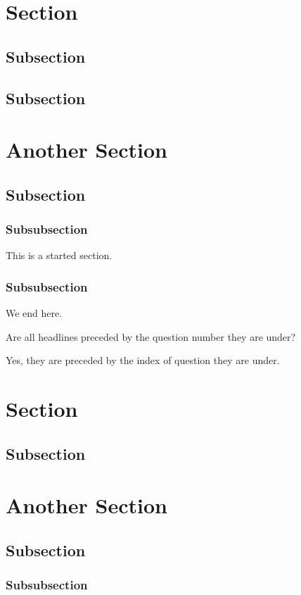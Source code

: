 \documentclass{homework}
\begin{document}
\section{Section}
\subsection{Subsection}
\subsection{Subsection}

\section{Another Section}
\subsection{Subsection}
\subsubsection*{Subsubsection} This is a started section.
\subsubsection{Subsubsection} We end here.

\question Are all headlines preceded by the question number they are under?

Yes, they are preceded by the index of question they are under.

\section{Section}
\subsection{Subsection}

\section{Another Section}
\subsection{Subsection}
\subsubsection{Subsubsection}
\end{document}
